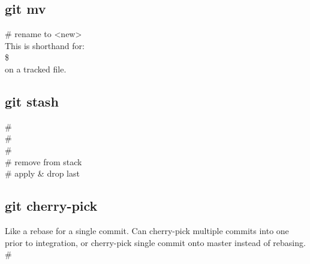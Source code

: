 \subsection*{git mv}
 \# rename to <new>\\
This is shorthand for:\\
\$  \\
on a tracked file.\\


\subsection*{git stash}
 \# \\
 \# \\
 \# \\
 \# remove from stack \\
 \# apply \& drop last \\

\subsection*{git cherry-pick}
Like a rebase for a single commit. Can cherry-pick multiple commits into one prior to integration, or cherry-pick single commit onto master instead of rebasing. \\
 \# \\

